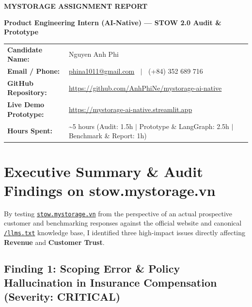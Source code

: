 \documentclass[10pt,a4paper]{article}
\begin{document}
\begin{center}
  {\Large\bfseries\color{TextDark} MYSTORAGE ASSIGNMENT REPORT}\par
  \vspace{0.15em}
  {\small\bfseries\color{GrayDark} Product Engineering Intern (AI-Native) --- STOW 2.0 Audit \& Prototype}\par
\end{center}

\vspace{-0.2em}

\begin{tabularx}{\textwidth}{>{\bfseries\footnotesize}p{3.5cm} >{\raggedright\arraybackslash\footnotesize}X}
\toprule
Candidate Name: & Nguyen Anh Phi \\
Email / Phone: & \href{mailto:phina1011@gmail.com}{phina1011@gmail.com} $\;\mid\;$ (+84) 352 689 716 \\
GitHub Repository: & \url{https://github.com/AnhPhiNe/mystorage-ai-native} \\
Live Demo Prototype: & \url{https://mystorage-ai-native.streamlit.app} \\
Hours Spent: & \textasciitilde 5 hours (Audit: 1.5h $\mid$ Prototype \& LangGraph: 2.5h $\mid$ Benchmark \& Report: 1h) \\
\bottomrule
\end{tabularx}

\vspace{0.2em}

\section{Executive Summary \& Audit Findings on stow.mystorage.vn}

By testing \href{https://stow.mystorage.vn}{\texttt{stow.mystorage.vn}} from the perspective of an actual prospective customer and benchmarking responses against the official website and canonical \href{https://mystorage.vn/llms.txt}{\texttt{/llms.txt}} knowledge base, I identified three high-impact issues directly affecting \textbf{Revenue} and \textbf{Customer Trust}.

\subsection*{Finding 1: Scoping Error \& Policy Hallucination in Insurance Compensation (Severity: CRITICAL)}
\end{document}
